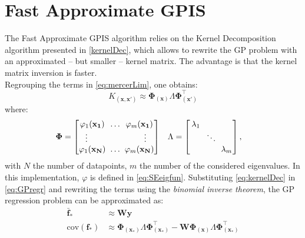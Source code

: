 \documentclass[10pt,a4paper,twocolumn]{article}
\newcommand{\trsp}{{\scriptscriptstyle\top}}
\newcommand{\cov}{\mathrm{cov}}
\begin{document}
\section{Fast Approximate GPIS}	
The Fast Approximate GPIS algorithm \cite{joukov_fast_2020} relies on the Kernel Decomposition algorithm presented in \autoref{kernelDec}, which allows to rewrite the GP problem with an approximated -- but smaller -- kernel matrix. The advantage is that the kernel matrix inversion is faster.\\
Regrouping the terms in \autoref{eq:mercerLim}, one obtains:
\begin{equation}\label{eq:kernelDec}
	K_{(\mathbf{x}, \mathbf{x'})} \approx \mathbf{\Phi}_{(\mathbf{x})} \Lambda \mathbf{\Phi}_{(\mathbf{x'})}^\trsp
\end{equation}
where:
\begin{align}
	\mathbf{\Phi} &=
	\begin{bmatrix}
		\varphi_1(\mathbf{x_1}) \hspace{-5mm} && \ldots && \hspace{-5mm} \varphi_m(\mathbf{x_1}) \\
		\vdots && && \vdots \\
		\varphi_1(\mathbf{x_N}) \hspace{-5mm} && \ldots && \hspace{-5mm} \varphi_m(\mathbf{x_N})
	\end{bmatrix}
	&&
	\Lambda = 
	\begin{bmatrix}
		\lambda_1 \hspace{-5mm}&& && \\
		&& \ddots && \\
		&& && \hspace{-5mm} \lambda_m
	\end{bmatrix},
\end{align}
with $N$ the number of datapoints, $m$ the number of the considered eigenvalues. In this implementation, $\varphi$ is defined in \autoref{eq:SEeigfun}.
Substituting \autoref{eq:kernelDec} in \autoref{eq:GPregr} and rewriting the terms using the \textit{binomial inverse theorem}, the GP regression problem can be approximated as:
\begin{equation}
	\begin{aligned}
		\mathbf{\bar{f}_*} &\approx \mathbf{W}\mathbf{y}\\    
		\cov(\mathbf{f}_*) &\approx \mathbf{\Phi}_{(\mathbf{x}_*)} \Lambda \mathbf{\Phi}_{(\mathbf{x}_*)}^\trsp - \mathbf{W} \mathbf{\Phi}_{(\mathbf{x})} \Lambda \mathbf{\Phi}_{(\mathbf{x}_*)}^\trsp
	\end{aligned}
\end{equation}
\end{document}
